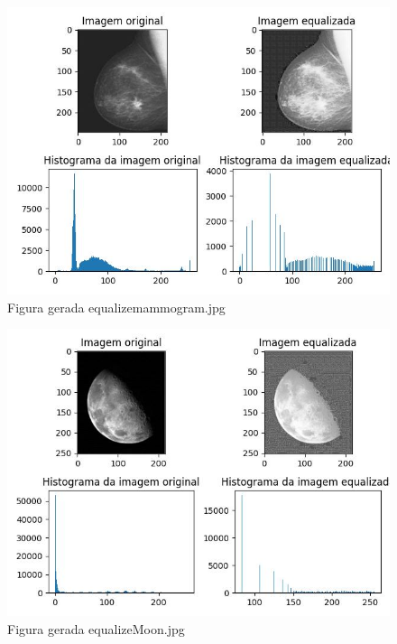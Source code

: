 \documentclass[10pt,a4paper]{article}
\begin{document}
\begin{figure}[H]
    \centering
    \includegraphics[scale=0.7]{images_generate/05/equalize_mammogram.jpg}
    \caption{Figura gerada equalize\textunderscore mammogram.jpg}
\end{figure}

\begin{figure}[H]
    \centering
    \includegraphics[scale=0.7]{images_generate/05/equalize_Moon.jpg}
    \caption{Figura gerada equalize\textunderscore Moon.jpg}
\end{figure}
\end{document}
